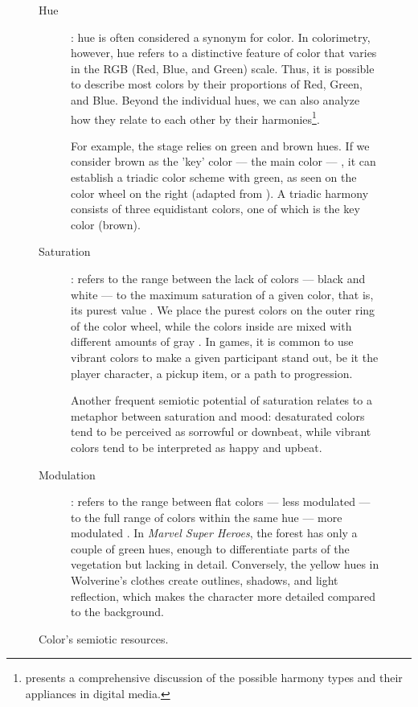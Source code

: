 \documentclass[english]{textolivre}
\begin{document}
\begin{figure}[htbp]
\begin{minipage}[t]{0.47\textwidth}
\label{fig3}
\end{minipage}
\caption{Color’s semiotic resources.}
\label{chart1}
\begin{minipage}[t]{\textwidth}
\small
\vspace{2ex}
\begin{description}
    \item[Hue]: hue is often considered a synonym for color. In colorimetry, however, hue refers to a distinctive feature of color that varies in the RGB (Red, Blue, and Green) scale. Thus, it is possible to describe most colors by their proportions of Red, Green, and Blue. Beyond the individual hues, we can also analyze how they relate to each other by their harmonies\footnote{\textcite[p. 86-97]{rhyne_applying_2017} presents a comprehensive discussion of the possible harmony types and their appliances in digital media.}.
    
    For example, the stage relies on green and brown hues. If we consider brown as the 'key' color — the main color — \cite[p.~86]{rhyne_applying_2017}, 
    it can establish a triadic color scheme with green, as seen on the color wheel on the right (adapted from \textcite[p.~96]{rhyne_applying_2017}).
    A triadic harmony consists of three equidistant colors, one of which is the key color (brown).

    \item[Saturation]:  refers to the range between the lack of colors — black and white — to the maximum saturation of a given color, that is, its purest value \cites[p.~167]{van_leeuwen_introducing_2005}[p.~61–2]{rhyne_applying_2017}.
    We place the purest colors on the outer ring of the color wheel, while the colors inside are mixed with different amounts of gray \cite[p. 61]{rhyne_applying_2017}. In games, it is common to use vibrant colors to make a given participant stand out, be it the player character, a pickup item, or a path to progression.
    
    Another frequent semiotic potential of saturation relates to a metaphor \cite[p. 30]{van_leeuwen_introducing_2005} between saturation and mood: desaturated colors tend to be perceived as sorrowful or downbeat, while vibrant colors tend to be interpreted as happy and upbeat.

    \item[Modulation]: refers to the range between flat colors — less modulated — to the full range of colors within the same hue — more modulated \cite[p. 167]{van_leeuwen_introducing_2005}. In \textit{Marvel Super Heroes}, the forest has only a couple of green hues, enough to differentiate parts of the vegetation but lacking in detail. Conversely, the yellow hues in Wolverine’s clothes create outlines, shadows, and light reflection, which makes the character more detailed compared to the background.


\end{description}
\end{minipage}
\end{figure}
\end{document}
